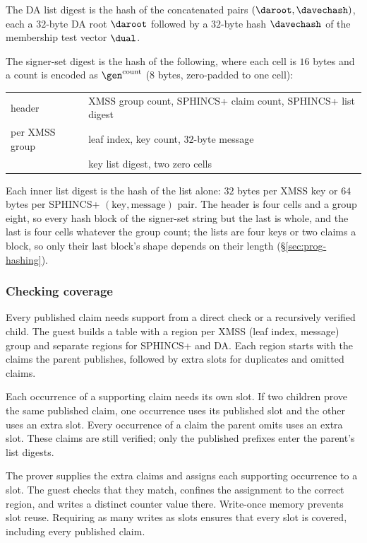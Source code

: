 The DA list digest is the hash of the concatenated pairs $(\daroot,\davechash)$, each a $32$-byte DA root $\daroot$ followed by a $32$-byte hash $\davechash$ of the membership test vector $\dual$.

The signer-set digest is the hash of the following, where each cell is $16$ bytes and a count is encoded as $\gen^{\text{count}}$ (8 bytes, zero-padded to one cell):
\begin{center}
\begin{tabular}{@{}ll@{}}
\hline
header & XMSS group count, SPHINCS+ claim count, SPHINCS+ list digest\\
per XMSS group & leaf index, key count, $32$-byte message\\
& key list digest, two zero cells\\
\hline
\end{tabular}
\end{center}
Each inner list digest is the hash of the list alone: $32$ bytes per XMSS key or $64$ bytes per SPHINCS+ $(\text{key},\text{message})$ pair. The header is four cells and a group eight, so every hash block of the signer-set string but the last is whole, and the last is four cells whatever the group count; the lists are four keys or two claims a block, so only their last block's shape depends on their length (\S\ref{sec:prog-hashing}).

\subsubsection{Checking coverage}

Every published claim needs support from a direct check or a recursively verified child. The guest builds a table with a region per XMSS (leaf index, message) group and separate regions for SPHINCS+ and DA. Each region starts with the claims the parent publishes, followed by extra slots for duplicates and omitted claims.

Each occurrence of a supporting claim needs its own slot. If two children prove the same published claim, one occurrence uses its published slot and the other uses an extra slot. Every occurrence of a claim the parent omits uses an extra slot. These claims are still verified; only the published prefixes enter the parent's list digests.

The prover supplies the extra claims and assigns each supporting occurrence to a slot. The guest checks that they match, confines the assignment to the correct region, and writes a distinct counter value there. Write-once memory prevents slot reuse. Requiring as many writes as slots ensures that every slot is covered, including every published claim.

